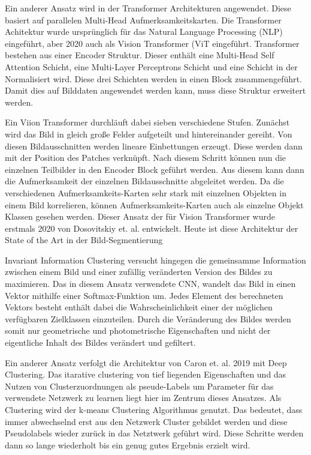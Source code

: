 Ein anderer Ansatz wird in der Transformer Architekturen angewendet.\cite{transformer_vaswani_2023}
Diese basiert auf parallelen Multi-Head Aufmerksamkeitskarten. 
Die Transformer Achitektur wurde ursprünglich für das Natural Language Processing (NLP) eingeführt, aber 2020 \cite{DERT_carion_2020} auch als Vision Transformer (ViT eingeführt. 
Transformer bestehen aus einer Encoder Struktur. Dieser enthält eine Multi-Head Self Attention Schicht, eine Multi-Layer Perceptrons Schicht und eine Schicht in der Normalisiert wird. Diese drei Schichten werden in einen Block zusammengeführt. Damit dies auf Bilddaten angewendet werden kann, muss diese Struktur erweitert werden.  

Ein Viion Transformer durchläuft dabei sieben verschiedene Stufen. Zunächst wird das Bild in gleich große Felder aufgeteilt und hintereinander gereiht. Von diesen Bildausschnitten werden lineare Einbettungen erzeugt. Diese werden dann mit der Position des Patches verknüpft. Nach diesem Schritt können nun die einzelnen Teilbilder in den Encoder Block geführt werden. Aus diesem kann dann die Aufmerksamkeit der einzelnen Bildausschnitte abgeleitet werden. Da die verschiedenen Aufmerksamkeits-Karten sehr stark mit einzelnen Objekten in einem Bild korrelieren, können Aufmerksamkeits-Karten auch als einzelne Objekt Klassen gesehen werden. Dieser Ansatz der für Vision Transformer wurde erstmals 2020 von Dosovitskiy et. al. entwickelt. \cite{DosovitskiyTransformer2020}  Heute ist diese Architektur der State of the Art in der Bild-Segmentierung

Invariant Information Clustering \cite{iic_ji_2018} versucht hingegen die gemeinsamme Information zwischen einem Bild und einer zufällig veränderten Version des Bildes zu maximieren. Das in diesem Ansatz verwendete CNN, wandelt das Bild in einen Vektor mithilfe einer Softmax-Funktion um. Jedes Element des berechneten Vektors besteht enthält dabei die Wahrscheinlichkeit einer der möglichen verfügbaren Zielklassen einzuteilen. Durch die Veränderung des Bildes werden somit nur geometrische und photometrische Eigenschaften und nicht der eigentliche Inhalt des Bildes verändert und gefiltert. 

Ein anderer Ansatz verfolgt die Architektur von Caron et. al. 2019 \cite{deepClustering_caron_2019} mit Deep Clustering. Das itarative clustering von tief liegenden Eigenschaften und das Nutzen von Clusterzuordnungen als pseude-Labels um Parameter für das verwendete Netzwerk zu learnen liegt hier im Zentrum dieses Ansatzes. Als Clustering wird der k-means Clustering Algorithmus genutzt.
Das bedeutet, dass immer abwechselnd erst aus den Netzwerk Cluster gebildet werden und diese Pseudolabels wieder zurück in das Netztwerk geführt wird. Diese Schritte werden dann so lange wiederholt bis ein genug gutes Ergebnis erzielt wird.

